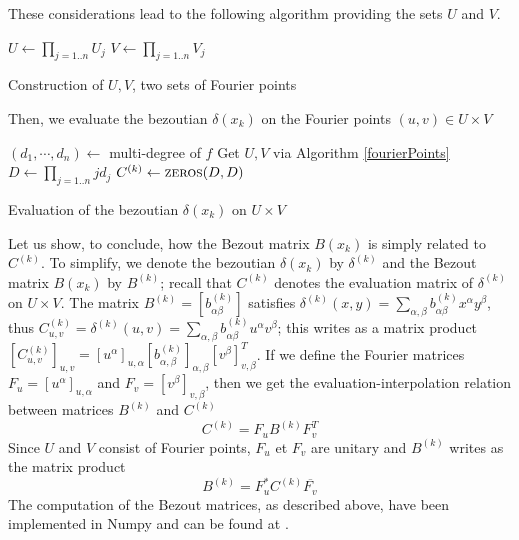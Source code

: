 \documentclass{standalone}
\begin{document}
These considerations lead to the following algorithm providing the sets $U$ and $V$.


\begin{algorithm}[]
\label{fourierPoints}
$U \gets \prod_{j=1..n}U_j$\;
$V \gets \prod_{j=1..n}V_j$\;
\caption{Construction of $U, V$, two sets of Fourier points}
\end{algorithm}

Then, we evaluate the bezoutian $\delta(x_k)$ on the Fourier points $(u, v) \in U\times V$

\begin{algorithm}[]
\label{algo_2}
$(d_1, \cdots, d_n) \gets$ multi-degree of $f$\;
Get $U, V$ via Algorithm \ref{fourierPoints}\;
$D \gets \prod_{j=1..n}jd_j$\;
$C^{(k)} \gets \textsc{zeros}(D, D)$\;
\caption{Evaluation of the bezoutian $\delta(x_k)$ on $U\times V$}
\end{algorithm}

Let us show, to conclude, how the Bezout matrix $B(x_k)$ is simply related to $C^{(k)}$.
To simplify, we denote the bezoutian $\delta(x_k)$ by $\delta^{(k)}$ and the Bezout matrix $B(x_k)$ by $B^{(k)}$; recall that $C^{(k)}$ denotes the evaluation matrix of $\delta^(k)$ on $U\times V$.
The matrix $B^{(k)} = \left[b^{(k)}_{\alpha\beta}\right]$ satisfies $\delta^{(k)}(x, y) = \sum_{\alpha,\beta} b^{(k)}_{\alpha\beta} x^\alpha y^\beta$,
thus $C^{(k)}_{u,v} = \delta^{(k)}(u, v) = \sum_{\alpha,\beta} b^{(k)}_{\alpha\beta} u^\alpha v^\beta$; this writes as a matrix product
$\left[C^{(k)}_{u,v}\right]_{u,v} = \left[u^\alpha\right]_{u,\alpha} \left[b^{(k)}_{\alpha,\beta}\right]_{\alpha, \beta} \left[v^\beta\right]_{v, \beta}^T$. If we define the Fourier matrices $F_u = \left[ u^\alpha \right]_{u, \alpha}$ and $F_v = \left[ v^\beta \right]_{v, \beta}$, then we get the evaluation-interpolation relation between matrices $B^{(k)}$ and $C^{(k)}$
\begin{equation}
C^{(k)} = F_uB^{(k)} F_v^T
 \end{equation}
Since $U$ and $V$ consist of Fourier points, $F_u$ et $F_v$ are unitary and $B^{(k)}$ writes as the matrix product
 \begin{equation}
 B^{(k)} = F_u^*C^{(k)} \overline{F_v}
 \end{equation}
The computation of the Bezout matrices, as described above, have been implemented in Numpy and can be found at \cite{jp_code}.
\end{document}
